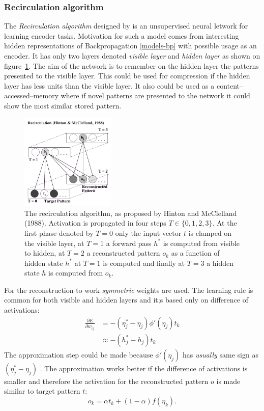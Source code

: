 \subsubsection{Recirculation algorithm}
\label{models-recirc} 


The \emph{Recirculation algorithm} designed by \citet{hinton1988learning} is an unsupervised neural letwork for learning encoder tasks. Motivation for such a model comes from interesting hidden representations of Backpropagation \ref{models-bp} with possible usage as an encoder. It has only two layers denoted \emph{visible layer} and \emph{hidden layer} as shown on figure~\ref{fig:models-recirc}. The aim of the network is to remember on the hidden layer the patterns presented to the visible layer. This could be used for compression if the hidden layer has less units than the visible layer. It also could be used as a content--accessed--memory where if novel patterns are presented to the network it could show the most similar stored pattern. 

\begin{figure}[h]
  \centering
\includegraphics[width=0.4\textwidth]{img/recirculation.png}
  \caption{The recirculation algorithm, as proposed by Hinton and McClelland (1988). Activation is propagated in four steps $T \in \{0,1,2,3\}$. At the first phase denoted by $T=0$ only the input vector $t$ is clamped on the visible layer, at $T=1$ a forward pass $h^{*}$ is computed from visible to hidden, at $T=2$ a reconstructed pattern $o_k$ as a function of hidden state $h^{*}$ at $T=1$ is computed and finally at $T=3$ a hidden state $h$ is computed from $o_k$.}
  \label{fig:models-recirc}
\end{figure}

For the reconstruction to work \emph{symmetric} weights are used. The learning rule is common for both visible and hidden layers and it;s based only on difference of activations: 
\begin{align}
\frac{\partial E}{\partial w_{ij}} &= -(\eta^{*}_j - \eta_j) \phi'(\eta_j) t_k \\
&\approx -(h^{*}_j - h_j)t_k
\end{align} 
The approximation step could be made because $\phi'(\eta_j)$ has \emph{usually} same sign as $(\eta^{*}_j - \eta_j) $ \citep{hinton1988learning, o1996bio}. The approximation works better if the difference of activations is smaller and therefore the activation for the reconstructed pattern $o$  is made similar to target pattern $t$: 
\begin{equation}
o_k = \alpha t_k + (1-\alpha)f(\eta_k). 
\end{equation} 

